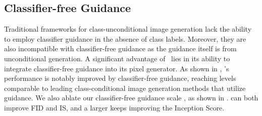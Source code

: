 \begin{table}[t]
\caption{\textbf{Image generation performance on ImageNet 256256 with guidance.} \name~seamlessly enables classifier-free guidance for unconditional image generation, achieving results on par with state-of-the-art class-conditional generative models with guidance.}
\vspace{-15pt}
\label{tab:cfg}
\begin{center}{
}
\end{center}
\vspace{-10pt}
\end{table}

\subsection{Classifier-free Guidance}
\label{sec:cfg}

Traditional frameworks for class-unconditional image generation lack the ability to employ classifier guidance \cite{dhariwal2021diffusion} in the absence of class labels. Moreover, they are also incompatible with classifier-free guidance as the guidance itself is from unconditional generation. A significant advantage of \name~lies in its ability to integrate classifier-free guidance into its pixel generator. As shown in , \name's performance is notably improved by classifier-free guidance, reaching levels comparable to leading class-conditional image generation methods that utilize guidance. We also ablate our classifier-free guidance scale , as shown in .  can both improve FID and IS, and a larger  keeps improving the Inception Score.

